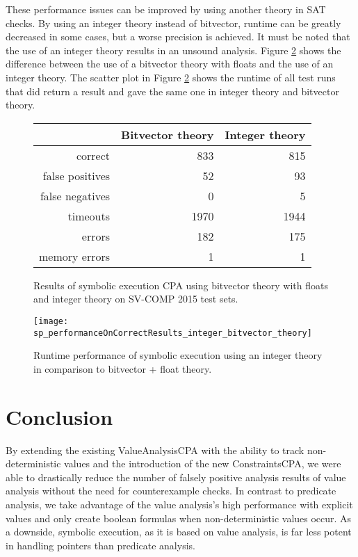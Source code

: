 These performance issues can be improved by using another theory in SAT checks.
By using an integer theory instead of bitvector, runtime can be greatly decreased in some cases, but a worse precision is achieved.
It must be noted that the use of an integer theory results in an unsound analysis. Figure \ref{graph:bitvecIntComp} shows the difference between the use of a bitvector theory with floats and the use of an integer theory.
The scatter plot in Figure \ref{graph:bitvecIntComp} shows the runtime of all test runs that did return a result and gave the same one in integer theory and bitvector theory.
\begin{figure}
\begin{tabular}{| r || r | r |}
\hline
& Bitvector theory & Integer theory \\ \hline
correct         &  833 &  815 \\ \hline
false positives &   52 &   93 \\ \hline
false negatives &    0 &    5 \\ \hline
timeouts        & 1970 & 1944 \\ \hline
errors          &  182 &  175 \\ \hline
memory errors   &    1 &    1 \\ \hline
\end{tabular}
\label{tab:bitvecIntComp}
\caption{Results of symbolic execution CPA using bitvector theory with floats and integer theory on SV-COMP 2015 test sets.}
\end{figure}

\begin{figure}
\texttt{[image: sp\_performanceOnCorrectResults\_integer\_bitvector\_theory]}
\label{graph:bitvecIntComp}
\caption{Runtime performance of symbolic execution using an integer theory in comparison to bitvector + float theory.}
\end{figure}

\section{Conclusion}
By extending the existing ValueAnalysisCPA with the ability to track non-deterministic values and the introduction of the new ConstraintsCPA,
we were able to drastically reduce the number of falsely positive analysis results of value analysis without the need for counterexample checks.
In contrast to predicate analysis, we take advantage of the value analysis's high performance with explicit values and only create boolean formulas when non-deterministic values occur.
As a downside, symbolic execution, as it is based on value analysis, is far less potent in handling pointers than predicate analysis.

